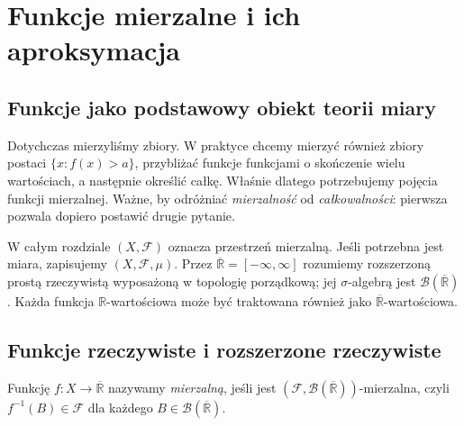 \chapter{Funkcje mierzalne i ich aproksymacja}
\label{ch:funkcje-mierzalne}

\providecommand{\atlasref}[2]{#2}


\section{Funkcje jako podstawowy obiekt teorii miary}

Dotychczas mierzyliśmy zbiory. W praktyce chcemy mierzyć
również zbiory postaci $\{x:f(x)>a\}$, przybliżać
funkcje funkcjami o skończenie wielu wartościach, a następnie
określić całkę. Właśnie dlatego potrzebujemy pojęcia
funkcji mierzalnej. Ważne, by odróżniać \emph{mierzalność}
od \emph{całkowalności}: pierwsza pozwala dopiero
postawić drugie pytanie.

W całym rozdziale $(X,\mathcal F)$ oznacza przestrzeń mierzalną.
Jeśli potrzebna jest miara, zapisujemy $(X,\mathcal F,\mu)$.
Przez $\overline{\mathbb R}=[-\infty,\infty]$ rozumiemy
rozszerzoną prostą rzeczywistą wyposażoną w topologię
porządkową; jej $\sigma$-algebrą jest
$\mathcal B(\overline{\mathbb R})$. Każda funkcja
$\mathbb R$-wartościowa może być traktowana również jako
$\overline{\mathbb R}$-wartościowa.

\section{Funkcje rzeczywiste i rozszerzone rzeczywiste}

\begin{definicja}
\label{def:extended-measurable}
Funkcję $f:X\to\overline{\mathbb R}$ nazywamy
\emph{mierzalną}, jeśli jest
$(\mathcal F,\mathcal B(\overline{\mathbb R}))$-mierzalna,
czyli $f^{-1}(B)\in\mathcal F$ dla każdego
$B\in\mathcal B(\overline{\mathbb R})$.
\end{definicja}

